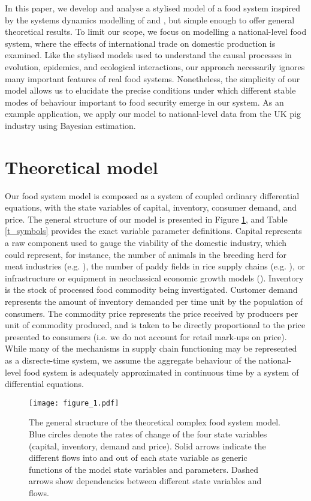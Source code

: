 \documentclass[12pt]{article}
\begin{document}
In this paper, we develop and analyse a stylised model of a food system inspired by the systems dynamics modelling of \textcite{meadows1971} and \cite{sterman2000}, but simple enough to offer general theoretical results. To limit our scope, we focus on modelling a national-level food system, where the effects of international trade on domestic production is examined. Like the stylised models used to understand the causal processes in evolution, epidemics, and ecological interactions, our approach necessarily ignores many important features of real food systems. Nonetheless, the simplicity of our model allows us to elucidate the precise conditions under which different stable modes of behaviour important to food security emerge in our system. As an example application, we apply our model to national-level data from the UK pig industry using Bayesian estimation.

\section{Theoretical model}
Our food system model is composed as a system of coupled ordinary differential equations, with the state variables of capital, inventory, consumer demand, and price. The general structure of our model is presented in Figure \ref{fig_cfs}, and Table \ref{t_symbols} provides the exact variable parameter definitions. Capital represents a raw component used to gauge the viability of the domestic industry, which could represent, for instance, the number of animals in the breeding herd for meat industries (e.g. \cite{meadows1971}), the number of paddy fields in rice supply chains (e.g. \cite{chung2018}), or infrastructure or equipment in neoclassical economic growth models (\cite{ngonghala2017}). Inventory is the stock of processed food commodity being investigated. Customer demand represents the amount of inventory demanded per time unit by the population of consumers. The commodity price represents the price received by producers per unit of commodity produced, and is taken to be directly proportional to the price presented to consumers (i.e. we do not account for retail mark-ups on price). While many of the mechanisms in supply chain functioning may be represented as a disrecte-time system, we assume the aggregate behaviour of the national-level food system is adequately approximated in continuous time by a system of differential equations.

\begin{figure}[t!]
  \centering
  \texttt{[image: figure\_1.pdf]}
  \caption{The general structure of the theoretical complex food system model. Blue circles denote the rates of change of the four state variables (capital, inventory, demand and price). Solid arrows indicate the different flows into and out of each state variable as generic functions of the model state variables and parameters. Dashed arrows show dependencies between different state variables and flows.}
  \label{fig_cfs}
\end{figure}
\end{document}
